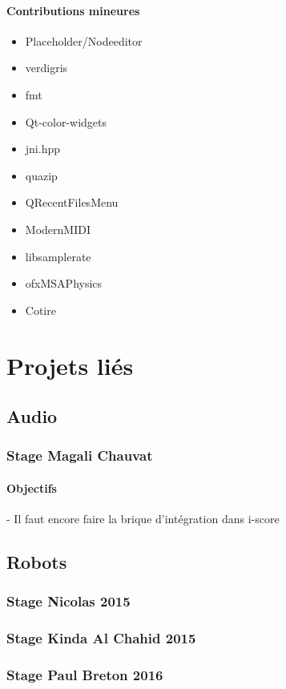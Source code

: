 \documentclass[french,a4paper,openany,12pt]{book}
\begin{document}
\paragraph{Contributions mineures}
\begin{itemize}
\item Placeholder/Nodeeditor
\item verdigris
\item fmt
\item Qt-color-widgets
\item jni.hpp
\item quazip
\item QRecentFilesMenu
\item ModernMIDI
\item libsamplerate
\item ofxMSAPhysics
\item Cotire
\end{itemize}

\section{Projets liés}

\subsection{Audio}

\subsubsection{Stage Magali Chauvat}
\paragraph{Objectifs}

- Il faut encore faire la brique d'intégration dans i-score
\subsection{Robots}
\subsubsection{Stage Nicolas 2015}
\subsubsection{Stage Kinda Al Chahid 2015}

\subsubsection{Stage Paul Breton 2016}
\end{document}
